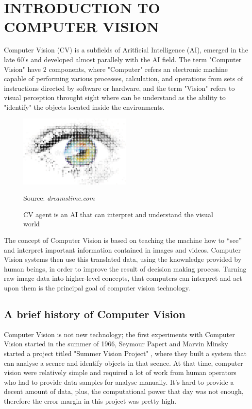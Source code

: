 \documentclass[12pt]{article}
\newcommand{\source}[1]{\caption*{Source: \emph{#1}} }
\begin{document}

\section{INTRODUCTION TO COMPUTER VISION}
Computer Vision (CV) is a subfields of Aritficial Intelligence (AI), emerged in the
late 60’s and developed almost parallely with the AI field. 
The term "Computer Vision" have 2 components, where "Computer" refers an electronic 
machine capable of performing various processes, calculation, and operations from 
sets of instructions directed by software or hardware, and the term "Vision" refers
to visual perception throught sight where can be understand as the ability to "identify"
the objects located inside the environments. 

\begin{figure}[htp]
    \centering
    \includegraphics[width=0.5\textwidth]{images/digital-eyes.jpg}
    \caption{CV agent is an AI that can interpret and understand the visual world}
    \label{fig:computer_vision}
    \source{dreamstime.com}
\end{figure}

The concept of Computer Vision is based on teaching the machine how to “see” and 
interpret important information contained in images and videos. Computer Vision 
systems then use this translated data, 
using the knownledge provided by human beings, in order to improve the result of 
decision making process. Turning raw image data into higher-level concepts, that 
computers can interpret and act upon them is the principal goal of computer vision 
technology. 

\subsection{A brief history of Computer Vision}
Computer Vision is not new technology; the first experiments with Computer Vision 
started in the summer of 1966, Seymour Papert and Marvin Minsky started a project titled 
"Summer Vision Project" \cite{summervision}, where they built a system that can analyse 
a scence and identify objects in that scence. At that time, computer vision were relatively
simple and required a lot of work from human operators who had to provide data samples 
for analyse manually. It's hard to provide a decent amount of data, plus, the computational
power that day was not enough, therefore the error margin in this project was pretty high. 
\end{document}

